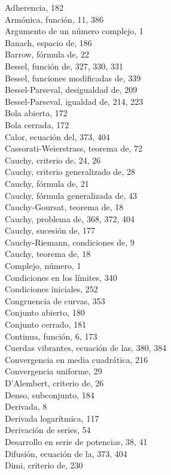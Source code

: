 \documentclass[10pt]{article}
\theoremstyle{plain}
\theoremstyle{definition}
\theoremstyle{remark}
\begin{document}
Adherencia, 182\\
Armónica, función, 11, 386\\
Argumento de un número complejo, 1\\
Banach, espacio de, 186\\
Barrow, fórmula de, 22\\
Bessel, función de, 327, 330, 331\\
Bessel, funciones modificadas de, 339\\
Bessel-Parseval, desigualdad de, 209\\
Bessel-Parseval, igualdad de, 214, 223\\
Bola abierta, 172\\
Bola cerrada, 172\\
Calor, ecuación del, 373, 404\\
Cassorati-Weierstrass, teorema de, 72\\
Cauchy, criterio de, 24, 26\\
Cauchy, criterio generalizado de, 28\\
Cauchy, fórmula de, 21\\
Cauchy, fórmula generalizada de, 43\\
Cauchy-Goursat, teorema de, 18\\
Cauchy, problema de, 368, 372, 404\\
Cauchy, sucesión de, 177\\
Cauchy-Riemann, condiciones de, 9\\
Cauchy, teorema de, 18\\
Complejo, número, 1\\
Condiciones en los límites, 340\\
Condiciones iniciales, 252\\
Congruencia de curvas, 353\\
Conjunto abierto, 180\\
Conjunto cerrado, 181\\
Continua, función, 6, 173\\
Cuerdas vibrantes, ecuación de las, 380, 384\\
Convergencia en media cuadrática, 216\\
Convergencia uniforme, 29\\
D'Alembert, criterio de, 26\\
Denso, subconjunto, 184\\
Derivada, 8\\
Derivada logarítmica, 117\\
Derivación de series, 54\\
Desarrollo en serie de potencias, 38, 41\\
Difusión, ecuación de la, 373, 404\\
Dimi, criterio de, 230
\end{document}
